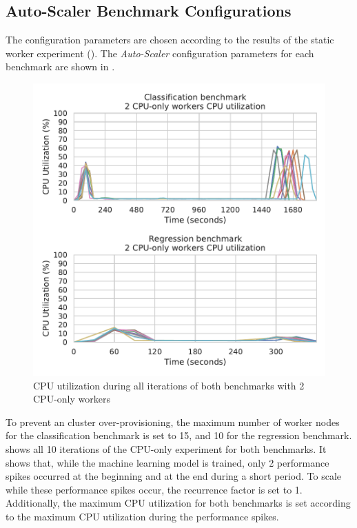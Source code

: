 \subsection{Auto-Scaler Benchmark Configurations}
The configuration parameters are chosen according to the results of the static worker experiment ().
The \textit{Auto-Scaler} configuration parameters for each benchmark are shown in .
\begin{figure}[h]
\centering
\includegraphics[scale=0.9]{images/07_evaluation/overall_auto-scaler_iterations}
\caption{CPU utilization during all iterations of both benchmarks with 2 CPU-only workers}
\label{fig:07_auto-scaler_iterations_results}
\end{figure}
To prevent an cluster over-provisioning, the maximum number of worker nodes for the classification benchmark is set to 15, and 10 for the regression benchmark.
 shows all 10 iterations of the CPU-only experiment for both benchmarks. It shows that, while the machine learning model is trained, only 2 performance spikes occurred at the beginning and at the end during a short period. To scale while these performance spikes occur, the recurrence factor is set to 1. Additionally, the maximum CPU utilization for both benchmarks is set according to the maximum CPU utilization during the performance spikes.
